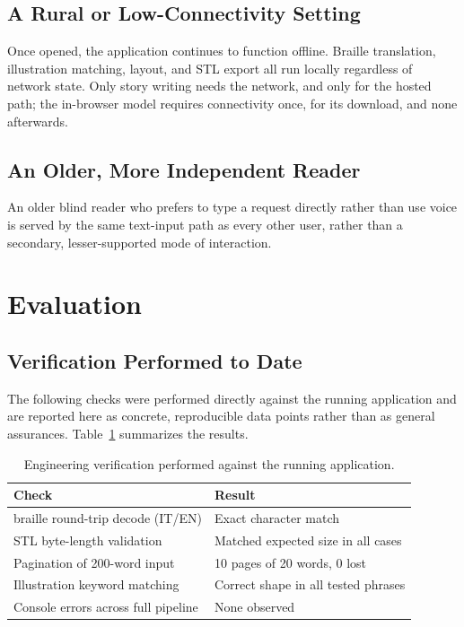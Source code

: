 \documentclass[conference]{IEEEtran}
\begin{document}
\subsection{A Rural or Low-Connectivity Setting}

Once opened, the application continues to function offline. Braille translation, illustration matching, layout, and STL export all run locally regardless of network state. Only story writing needs the network, and only for the hosted path; the in-browser model requires connectivity once, for its download, and none afterwards.

\subsection{An Older, More Independent Reader}

An older blind reader who prefers to type a request directly rather than use voice is served by the same text-input path as every other user, rather than a secondary, lesser-supported mode of interaction.

\section{Evaluation}\label{sec:evaluation}

\subsection{Verification Performed to Date}

The following checks were performed directly against the running application and are reported here as concrete, reproducible data points rather than as general assurances. Table~\ref{tab:verification} summarizes the results.

\begin{table}[t]
\caption{Engineering verification performed against the running application.}
\label{tab:verification}
\centering
\begin{tabular}{ll}
\toprule
Check & Result \\
\midrule
braille round-trip decode (IT/EN) & Exact character match \\
STL byte-length validation & Matched expected size in all cases \\
Pagination of 200-word input & 10 pages of 20 words, 0 lost \\
Illustration keyword matching & Correct shape in all tested phrases \\
Console errors across full pipeline & None observed \\
\bottomrule
\end{tabular}
\end{table}
\end{document}

